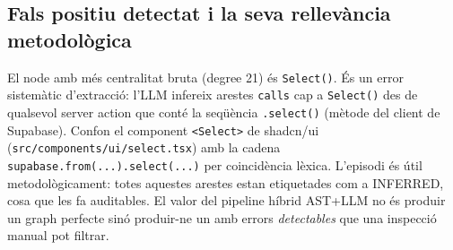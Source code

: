\subsection{Fals positiu detectat i la seva rellevància metodològica}
El node amb més centralitat bruta (degree 21) és \texttt{Select()}. És un error sistemàtic d'extracció: l'LLM infereix arestes \texttt{calls} cap a \texttt{Select()} des de qualsevol server action que conté la seqüència \texttt{.select()} (mètode del client de Supabase). Confon el component \texttt{<Select>} de shadcn/ui (\texttt{src/components/ui/select.tsx}) amb la cadena \texttt{supabase.from(...).select(...)} per coincidència lèxica. L'episodi és útil metodològicament: totes aquestes arestes estan etiquetades com a INFERRED, cosa que les fa auditables. El valor del pipeline híbrid AST+LLM no és produir un graph perfecte sinó produir-ne un amb errors \emph{detectables} que una inspecció manual pot filtrar.

